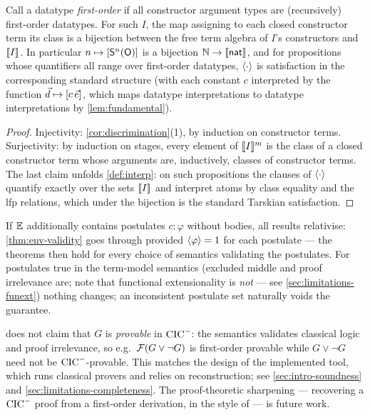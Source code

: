 \begin{proposition}
\label{prop:standard}
Call a datatype \emph{first-order} if all constructor argument types are
(recursively) first-order datatypes.  For such $I$, the map assigning to
each closed constructor term its class is a bijection between the free
term algebra of $I$'s constructors and $[\![ I ]\!]_{}$.  In particular $n
\mapsto [\mathsf{S}^n(\mathsf{O})]$ is a bijection $\mathbb{N} \to
[\![ \mathsf{nat} ]\!]_{}$, and for propositions whose quantifiers all range over
first-order datatypes, $\langle \cdot \rangle$ is satisfaction in the corresponding
standard structure (with each constant $c$ interpreted by the function
$\vec{d} \mapsto [c\,\vec{e}]$, which maps datatype interpretations
to datatype interpretations by \cref{lem:fundamental}).
\end{proposition}

\begin{proof}
Injectivity: \cref{cor:discrimination}(1), by induction on constructor
terms.  Surjectivity: by induction on stages, every element of
$[\![ I ]\!]^{m}$ is the class of a closed constructor term whose arguments
are, inductively, classes of constructor terms.  The last claim unfolds
\cref{def:interp}: on such propositions the clauses of $\langle \cdot \rangle$
quantify exactly over the sets $[\![ I ]\!]_{}$ and interpret atoms by class
equality and the lfp relations, which under the bijection is the standard
Tarskian satisfaction.
\end{proof}

\begin{remark}
\label{rem:axioms}
If $\mathbb{E}$ additionally contains postulates $c : \varphi$ without bodies,
all results relativise: \cref{thm:env-validity} goes through provided
$\langle \varphi \rangle = 1$ for each postulate --- the theorems then hold for
every choice of semantics validating the postulates.  For postulates
true in the term-model semantics (excluded middle and proof irrelevance
are; note that functional extensionality is \emph{not} --- see
\cref{sec:limitations-funext}) nothing changes; an inconsistent
postulate set naturally voids the guarantee.
\end{remark}

\begin{remark}
\label{rem:not-claimed}
 does not claim that $G$ is \emph{provable} in
$\mathrm{CIC}^{-}$: the semantics validates classical logic and proof irrelevance,
so e.g.\ $\mathcal{F}(G \vee \neg G)$ is first-order provable while $G \vee \neg
G$ need not be $\mathrm{CIC}^{-}$-provable.  This matches the design of the
implemented tool, which runs classical provers and relies on
reconstruction; see \cref{sec:intro-soundness} and
\cref{sec:limitations-completeness}.  The proof-theoretic sharpening ---
recovering a $\mathrm{CIC}^{-}$ proof from a first-order derivation, in the style of
\cite{Czajka2018} --- is future work.
\end{remark}
